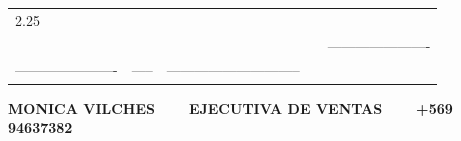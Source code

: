 \documentclass[10pt]{article}
\begin{document}
\begin{tabular}{lllll}
2.25 \\  
 & & & &\color{white}---------------------- \\
 \color{white}----------------------& \color{white}----- & \color{white}----------------------------- &\\

 \hline
 \end{tabular}
 \begin{center}
     \textbf{MONICA VILCHES  $\color{white}--$  EJECUTIVA DE VENTAS $\color{white}--$   +569 94637382}
 \end{center}
 
\end{document}
